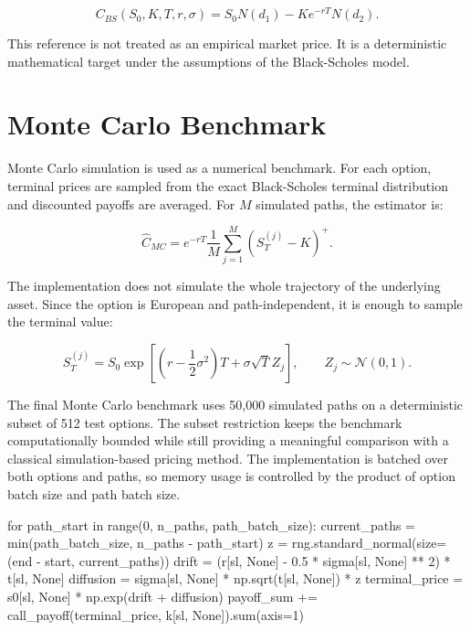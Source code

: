 \begin{equation}
    C_{BS}(S_0, K, T, r, \sigma)
    =
    S_0 N(d_1) - K e^{-rT} N(d_2).
\end{equation}

This reference is not treated as an empirical market price.
It is a deterministic mathematical target under the assumptions of the Black-Scholes model.

\section{Monte Carlo Benchmark}

Monte Carlo simulation is used as a numerical benchmark.
For each option, terminal prices are sampled from the exact Black-Scholes terminal distribution and discounted payoffs are averaged.
For $M$ simulated paths, the estimator is:

\begin{equation}
    \hat{C}_{MC}
    =
    e^{-rT}
    \frac{1}{M}
    \sum_{j=1}^{M}
    (S_T^{(j)} - K)^+.
\end{equation}

The implementation does not simulate the whole trajectory of the underlying asset.
Since the option is European and path-independent, it is enough to sample the terminal value:

\begin{equation}
    S_T^{(j)}
    =
    S_0
    \exp\left[
        \left(r - \frac{1}{2}\sigma^2\right)T
        +
        \sigma \sqrt{T} Z_j
    \right],
    \qquad Z_j \sim \mathcal{N}(0,1).
\end{equation}

The final Monte Carlo benchmark uses 50,000 simulated paths on a deterministic subset of 512 test options.
The subset restriction keeps the benchmark computationally bounded while still providing a meaningful comparison with a classical simulation-based pricing method.
The implementation is batched over both options and paths, so memory usage is controlled by the product of option batch size and path batch size.

\begin{projectlistingbox}
for path_start in range(0, n_paths, path_batch_size):
    current_paths = min(path_batch_size, n_paths - path_start)
    z = rng.standard_normal(size=(end - start, current_paths))
    drift = (r[sl, None] - 0.5 * sigma[sl, None] ** 2) * t[sl, None]
    diffusion = sigma[sl, None] * np.sqrt(t[sl, None]) * z
    terminal_price = s0[sl, None] * np.exp(drift + diffusion)
    payoff_sum += call_payoff(terminal_price, k[sl, None]).sum(axis=1)
\end{projectlistingbox}

